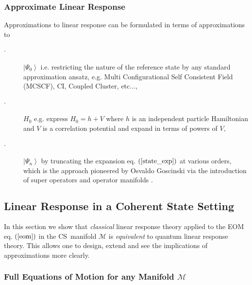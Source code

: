 \documentclass[aps,preprint]{revtex4}%
\begin{document}
\subsubsection{Approximate Linear Response\label{ap_linres}}

Approximations to linear response can be formulated in terms of approximations to

\begin{description}
\item[$\cdot$] $\left\vert \Psi_{0}\right\rangle $ i.e. restricting the nature
of the reference state by any standard approximation ansatz, e.g. Multi
Configurational Self Consistent Field (MCSCF), CI, Coupled Cluster, etc...,

\item[$\cdot$] $H_{0}$ e.g. express $H_{0}=h+V$ where $h$ is an independent
particle Hamiltonian and $V$ is a correlation potential and expand in terms of
powers of $V,$

\item[$\cdot$] $\left\vert \Psi_{n}\right\rangle $ by truncating the expansion
eq. $\left(  \ref{state_exp}\right)  $ at various orders, which is the
approach pioneered by Osvaldo Goscinski via the introduction of super
operators and operator manifolds \cite{Osvaldo}.
\end{description}

\subsection{Linear Response in a Coherent State Setting\label{CSset}}

In this section we show that \emph{classical }linear response theory applied
to the EOM eq. $\left(  \ref{eom}\right)  $ in the CS\ manifold $\mathcal{M}$
is \emph{equivalent }to quantum linear response theory. This allows one to
design, extend and see the implications of approximations more clearly.

\subsubsection{Full Equations of Motion for any Manifold $\mathcal{M}$}
\end{document}
